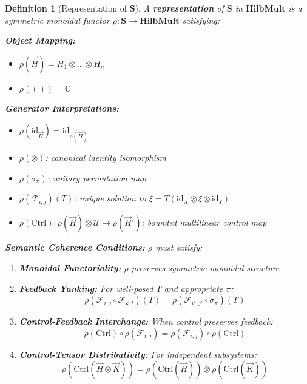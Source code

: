\documentclass[11pt]{article}
\newtheorem{definition}{Definition}
\begin{document}
\begin{definition}[Representation of $\mathbf{S}$]\label{def:representation}
A \textbf{representation} of $\mathbf{S}$ in $\mathbf{HilbMult}$ is a symmetric monoidal functor $\rho: \mathbf{S} \to \mathbf{HilbMult}$ satisfying:

\noindent\textbf{Object Mapping:}
\begin{itemize}
    \item $\rho(\vec{H}) = H_1 \otimes \dots \otimes H_n$
    \item $\rho(()) = \mathbb{C}$
\end{itemize}

\noindent\textbf{Generator Interpretations:}
\begin{itemize}
    \item $\rho(\mathrm{id}_{\vec{H}}) = \mathrm{id}_{\rho(\vec{H})}$
    \item $\rho(\otimes)$: canonical identity isomorphism
    \item $\rho(\sigma_{\pi})$: unitary permutation map
    \item $\rho(\mathcal{F}_{i,j})(T)$: unique solution to $\xi = T(\mathrm{id}_X \otimes \xi \otimes \mathrm{id}_Y)$
    \item $\rho(\mathrm{Ctrl}): \rho(\vec{H}) \otimes \mathcal{U} \to \rho(\vec{H}')$: bounded multilinear control map
\end{itemize}

\noindent\textbf{Semantic Coherence Conditions:} $\rho$ must satisfy:

\begin{enumerate}[label=(SC\arabic*)]
    \item \textbf{Monoidal Functoriality:} $\rho$ preserves symmetric monoidal structure
    
    \item \textbf{Feedback Yanking:} For well-posed $T$ and appropriate $\pi$:
    \[
    \rho(\mathcal{F}_{i,j} \circ \mathcal{F}_{k,l})(T) = \rho(\mathcal{F}_{i',j'} \circ \sigma_{\pi})(T)
    \]
    
    \item \textbf{Control-Feedback Interchange:} When control preserves feedback:
    \[
    \rho(\mathrm{Ctrl}) \circ \rho(\mathcal{F}_{i,j}) = \rho(\mathcal{F}_{i,j}) \circ \rho(\mathrm{Ctrl})
    \]
    
    \item \textbf{Control-Tensor Distributivity:} For independent subsystems:
    \[
    \rho(\mathrm{Ctrl}(\vec{H} \otimes \vec{K})) = \rho(\mathrm{Ctrl}(\vec{H})) \otimes \rho(\mathrm{Ctrl}(\vec{K}))
    \]
    

\end{enumerate}
\end{definition}
\end{document}
